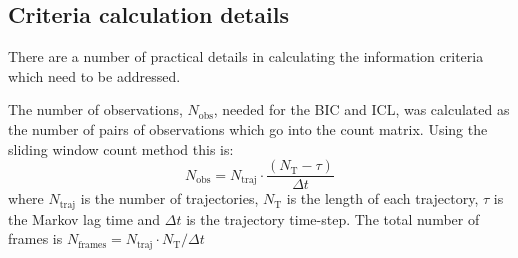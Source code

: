 \subsection{Criteria calculation details}\label{sec:hmm_details}
There are a number of practical details in calculating the information criteria which need to be addressed. 

The number of observations, $N_{\mathrm{obs}}$, needed for the BIC and ICL, was calculated as the number of pairs of observations which go into the count matrix. Using the sliding window count method this is:
\begin{equation}\label{eqn:hmm_nobs}
    N_{\mathrm{obs}} = N_{\mathrm{traj}}\cdot\frac{(N_{\mathrm{T}} - \tau)}{\Delta t}
\end{equation}
where $N_{\mathrm{traj}}$ is the number of trajectories, $N_{\mathrm{T}}$ is the length of each trajectory, $\tau$ is the Markov lag time and  $\Delta t$ is the trajectory time-step. The total number of frames is $N_{\mathrm{frames}} = N_{\mathrm{traj}}\cdot N_{\mathrm{T}} /\Delta t$


